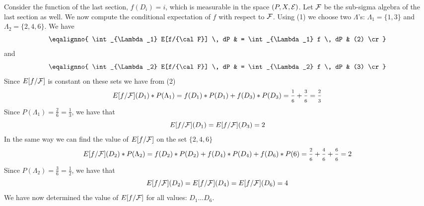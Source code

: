 Consider the function of the last section, $f(D_i) = i$, which is measurable in the 
space $(P,X,{\cal E})$. Let ${\cal F}$ be the sub-sigma algebra of the last section as well.
We now compute the conditional expectation of $f$ with respect to ${\cal F}$.
Using (1) we choose two $\Lambda$'s: $\Lambda_1 = \{1,3\}$ and $\Lambda_2 = \{2,4,6\}$. 
We have
$$
\eqalignno{
\int_{\Lambda_1} E[f/{\cal F}] \, dP & 
= \int_{\Lambda_1} f \, dP & (2) \cr
}
$$
and
$$
\eqalignno{
\int_{\Lambda_2} E[f/{\cal F}] \, dP & 
= \int_{\Lambda_2} f \, dP & (3) \cr
}
$$
Since 
$E[f/{\cal F}]$ is constant on these sets we have from (2)
$$
E[f/{\cal F}](D_1) * P(\Lambda_1) = f(D_1) * P(D_1) + f(D_3) * P(D_3) 
= \frac{1}{6} + \frac{3}{6} = \frac{2}{3}
$$
Since $P(\Lambda_1) = \frac{2}{6} = \frac{1}{3}$, we have that 
$$
E[f/{\cal F}](D_1) = E[f/{\cal F}](D_3) = 2
$$
In the same way we can find the value of $E[f/{\cal F}]$ on the set $\{2,4,6\}$
$$
E[f/{\cal F}](D_2) * P(\Lambda_2) = f(D_2) * P(D_2) + f(D_4) * P(D_4) + f(D_6) * P(6) 
= \frac{2}{6} + \frac{4}{6} + \frac{6}{6} = 2
$$
Since $P(\Lambda_2) = \frac{3}{6} = \frac{1}{2}$, we have that 
$$
E[f/{\cal F}](D_2) = E[f/{\cal F}](D_4) = E[f/{\cal F}](D_6) = 4
$$
We have now determined the value of $E[f/{\cal F}]$ for all values: $D_1\ldots D_6$.


\bye



